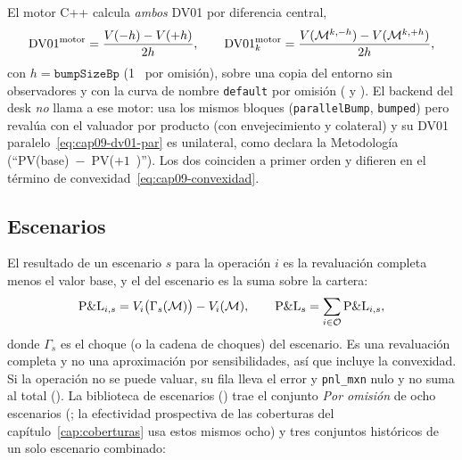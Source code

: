 \begin{diferencia}
  El motor C++  calcula \emph{ambos} DV01 por diferencia central,
  \begin{equation}\label{eq:cap09-dv01-motor}
    \mathrm{DV01}^{\mathrm{motor}}=\frac{V(-h)-V(+h)}{2h},\qquad
    \mathrm{DV01}^{\mathrm{motor}}_k=\frac{V(\mathcal M^{k,-h})-V(\mathcal M^{k,+h})}{2h},
  \end{equation}
  con $h=\texttt{bumpSizeBp}$ (1~\pb{} por omisión), sobre una copia del entorno sin observadores y con la curva de nombre
  \texttt{default} por omisión ( y
  ). El backend del desk \emph{no} llama a ese motor: usa los
  mismos bloques (\texttt{parallelBump}, \texttt{bumped}) pero revalúa con el valuador por producto (con envejecimiento y
  colateral) y su DV01 paralelo~\eqref{eq:cap09-dv01-par} es unilateral, como declara la Metodología (``PV(base)~$-$~PV($+1$~\pb)'').
  Los dos coinciden a primer orden y difieren en el término de convexidad~\eqref{eq:cap09-convexidad}.
\end{diferencia}

\subsection{Escenarios}\label{sec:cap09-escenarios}

El resultado de un escenario $s$ para la operación $i$ es la revaluación completa menos el valor base, y el del escenario es la suma sobre la cartera:
\begin{equation}\label{eq:cap09-escenario}
  \mathrm{P\&L}_{i,s}=V_i\bigl(\Gamma_s(\mathcal M)\bigr)-V_i(\mathcal M),\qquad
  \mathrm{P\&L}_s=\sum_{i\in\mathcal O}\mathrm{P\&L}_{i,s},
\end{equation}
donde $\Gamma_s$ es el choque (o la cadena de choques) del escenario. Es una revaluación completa y no una aproximación por sensibilidades, así que incluye la convexidad. Si la operación no se puede valuar, su fila lleva el error y \texttt{pnl\_mxn} nulo y no suma al total (). La biblioteca de escenarios () trae el conjunto \emph{Por omisión} de ocho escenarios (; la efectividad prospectiva de las coberturas del capítulo~\ref{cap:coberturas} usa estos mismos ocho) y tres conjuntos históricos de un solo escenario combinado:

